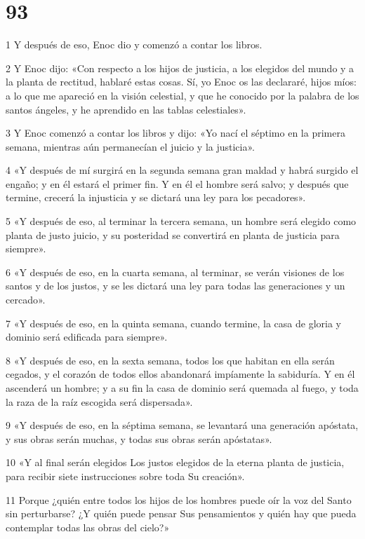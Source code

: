 \chapter{93}

\par 1 Y después de eso, Enoc dio y comenzó a contar los libros.
\par 2 Y Enoc dijo: «Con respecto a los hijos de justicia, a los elegidos del mundo y a la planta de rectitud, hablaré estas cosas. Sí, yo Enoc os las declararé, hijos míos: a lo que me apareció en la visión celestial, y que he conocido por la palabra de los santos ángeles, y he aprendido en las tablas celestiales».
\par 3 Y Enoc comenzó a contar los libros y dijo: «Yo nací el séptimo en la primera semana, mientras aún permanecían el juicio y la justicia».
\par 4 «Y después de mí surgirá en la segunda semana gran maldad y habrá surgido el engaño; y en él estará el primer fin. Y en él el hombre será salvo; y después que termine, crecerá la injusticia y se dictará una ley para los pecadores».
\par 5 «Y después de eso, al terminar la tercera semana, un hombre será elegido como planta de justo juicio, y su posteridad se convertirá en planta de justicia para siempre».
\par 6 «Y después de eso, en la cuarta semana, al terminar, se verán visiones de los santos y de los justos, y se les dictará una ley para todas las generaciones y un cercado».
\par 7 «Y después de eso, en la quinta semana, cuando termine, la casa de gloria y dominio será edificada para siempre».
\par 8 «Y después de eso, en la sexta semana, todos los que habitan en ella serán cegados, y el corazón de todos ellos abandonará impíamente la sabiduría. Y en él ascenderá un hombre; y a su fin la casa de dominio será quemada al fuego, y toda la raza de la raíz escogida será dispersada».
\par 9 «Y después de eso, en la séptima semana, se levantará una generación apóstata, y sus obras serán muchas, y todas sus obras serán apóstatas».
\par 10 «Y al final serán elegidos Los justos elegidos de la eterna planta de justicia, para recibir siete instrucciones sobre toda Su creación».
\par 11 Porque ¿quién entre todos los hijos de los hombres puede oír la voz del Santo sin perturbarse? ¿Y quién puede pensar Sus pensamientos y quién hay que pueda contemplar todas las obras del cielo?»
